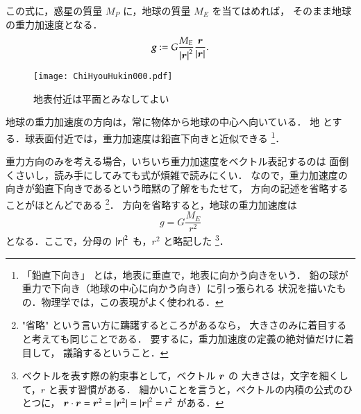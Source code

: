             この式に，惑星の質量 $M_{P}$ に，地球の質量 $M_{E}$ を当てはめれば，
            そのまま地球の重力加速度となる．
                \begin{equation*}
                    \textit{\textbf{g}} :=
                    G\frac{M_{E}}{{\left| \boldsymbol{r} \right|}^{2}}
                    \frac{\boldsymbol{r}}{\left| \boldsymbol{r} \right|}.
                \end{equation*}
                \begin{figure}[hbt]
                    \begin{center}
                        \texttt{[image: ChiHyouHukin000.pdf]}
                        \caption{地表付近は平面とみなしてよい}
                        \label{fig:HoubutsuSen}
                    \end{center}
                \end{figure}
            地球の重力加速度の方向は，常に物体から地球の中心へ向いている．
            地 とする．球表面付近では，重力加速度は鉛直下向きと近似できる
                \footnote{
                    「鉛直下向き」 とは，地表に垂直で，地表に向かう向きをいう．
                    鉛の球が重力で下向き（地球の中心に向かう向き）に引っ張られる
                    状況を描いたもの．物理学では，この表現がよく使われる．
                }．

            重力方向のみを考える場合，いちいち重力加速度をベクトル表記するのは
            面倒くさいし，読み手にしてみても式が煩雑で読みにくい．
            なので，重力加速度の向きが鉛直下向きであるという暗黙の了解をもたせて，
            方向の記述を省略することがほとんどである
                \footnote{
                    "省略" という言い方に躊躇するところがあるなら，
                    大きさのみに着目すると考えても同じことである．
                    要するに，重力加速度の定義の絶対値だけに着目して，
                    議論するということ．
                }．
            方向を省略すると，地球の重力加速度は
                \begin{equation*}
                    g = G\frac{M_{E}}{{r}^{2}}
                \end{equation*}
            となる．ここで，分母の ${|\boldsymbol{r}|}^{2}$ も，$r^{2}$ と略記した
                \footnote{
                    ベクトルを表す際の約束事として，ベクトル $\boldsymbol{r}$ の
                    大きさは，文字を細くして，$r$ と表す習慣がある．
                    細かいことを言うと，ベクトルの内積の公式のひとつに，
                    $\boldsymbol{r}\cdot\boldsymbol{r} = {\boldsymbol{r}}^{2} = |{\boldsymbol{r}}^{2}| = {|\boldsymbol{r}|}^{2} = r^{2}$
                    がある．
                }．

